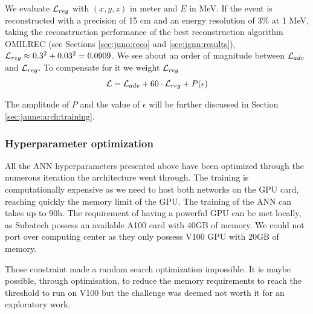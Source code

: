 \documentclass[../main.tex]{subfiles}
\begin{document}
We evaluate ${\cal L}_{reg}$ with $(x, y, z)$ in meter and $E$ in MeV. If the event is reconstructed with a precision of 15 cm and an energy resolution of 3\% at 1 MeV, taking the reconstruction performance of the best reconstruction algorithm OMILREC (see Sections \ref{sec:juno:reco} and \ref{sec:jgnn:results}), ${\cal L}_{reg} \approx 0.3^2 + 0.03^2 = 0.0909$. We see about an order of magnitude between ${\cal L}_{adv}$ and ${\cal L}_{reg}$. To compensate for it we weight ${\cal L}_{reg}$
\begin{equation}
  {\cal L} = {\cal L}_{adv} + 60\cdot{\cal L}_{reg} + P(\epsilon)
\end{equation}

The amplitude of $P$ and the value of $\epsilon$ will be further discussed in Section \ref{sec:janne:arch:training}.

\subsubsection{Hyperparameter optimization}

All the ANN hyperparameters presented above have been optimized through the numerous iteration the architecture went through. The training is computationally expensive as we need to host both networks on the GPU card, reaching quickly the memory limit of the GPU. The training of the ANN can takes up to 90h. The requirement of having a powerful GPU can be met locally, as Subatech possess an available A100 \cite{noauthor_nvidia_nodate-1} card with 40GB of memory. We could not port over computing center as they only possess V100 \cite{noauthor_nvidia_nodate-2} GPU with 20GB of memory.

Those constraint made a random search optimization impossible. It is maybe possible, through optimisation, to reduce the memory requirements to reach the threshold to run on V100 but the challenge was deemed not worth it for an exploratory work.
\end{document}
